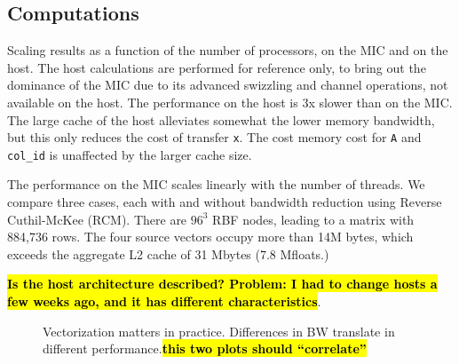 \documentclass[10pt,conference,compsocconf]{IEEEtran}
\newcommand{\todo}[1]{{\color{red}\textbf{\hl{#1}}\xspace}}
\begin{document}
\subsection{Computations}
Scaling results as a function of the number of processors, on the MIC and on the host. The host calculations
are performed for reference only, to bring out the dominance of the MIC due to its advanced swizzling and channel 
operations, not available on the host. The performance on the host is 3x slower than on the MIC. The large cache
of the host alleviates somewhat the lower memory bandwidth, but this only reduces the cost of transfer {\tt x}. 
The cost memory cost for {\tt A} and {\tt col\_id} is unaffected by the larger cache size. 

The performance on the MIC scales linearly with the number of threads. We compare three cases, each with and without bandwidth reduction using Reverse Cuthil-McKee (RCM). There are $96^3$ RBF nodes, leading to a matrix with 884,736 rows. The four source vectors occupy more than 14M bytes, which exceeds the aggregate L2 cache of 31 Mbytes (7.8 Mfloats.) 

\todo{Is the host architecture described? Problem: I had to change hosts a few weeks ago, and it has different characteristics}. 

\begin{figure}
  \centering
%
\hspace{.4in}
%
  \caption{Vectorization matters in practice. Differences in BW
    translate in different performance.\todo{this two plots should ``correlate'' }}
\end{figure}
\end{document}
